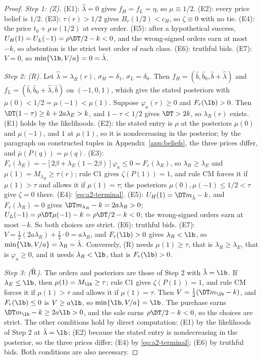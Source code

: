 \begin{proof}
\emph{Step 1: (Z).} (E1): \(\hat\lambda=0\) gives \(f_H=f_L=\eta\), so \(\mu\equiv1/2\). (E2): every price belief is
\(1/2\). (E3): \(\tau(r)>1/2\) gives \(B_r(1/2)<c_H\), so \(\zeta\equiv0\) with no tie. (E4): the price
\(t_0+\rho\,w(1/2)\) at every order. (E5): after a hypothetical success, \(U_H(1)=U_L(-1)=\rho\DT/2-k<0\), and the
wrong-signed orders earn at most \(-k\), so abstention is the strict best order of each class. (E6): truthful bids.
(E7): \(V=0\), so \(\min\{\lb,V/a\}=0=\hat\lambda\).

\emph{Step 2: (R).} Let \(\hat\lambda=\lambda_R(r)\), \(\sigma_H=\delta_1\), \(\sigma_L=\delta_0\). Then
\(f_H=(\hat b,\hat b_0,\hat b+\hat\lambda)\) and \(f_L=(\hat b,\hat b_0+\hat\lambda,\hat b)\) on \((-1,0,1)\), which give
the stated posteriors with \(\mu(0)<1/2=\mu(-1)<\mu(1)\). Suppose \(\varphi_a(r)\ge0\) and \(F_r(\lb)>0\). Then
\(\DT(1-\tau)\ge k+2a\lambda_E>k\), and \(1-\tau<1/2\) gives \(\DT>2k\), so \(\lambda_R(r)\) exists. (E1) holds by the
likelihoods. (E2): the stated entry is \(\rho\) at the posteriors \(\mu(0)\) and \(\mu(-1)\), and \(1\) at \(\mu(1)\),
so it is nondecreasing in the posterior; by the paragraph on constructed tuples in Appendix~\ref{app:beliefs}, the
three prices differ, and \(\bar\mu(P(q))=\mu(q)\). (E3): \(F_r(\lambda_E)=-[2\beta+\lambda_E(1-2\beta)]\varphi_a\le0
=F_r(\lambda_R)\), so \(\lambda_R\ge\lambda_E\) and \(\mu(1)=M_{\lambda_R}\ge\tau(r)\); rule C1 gives
\(\zeta(P(1))=1\), and rule CM forces it if \(\mu(1)>\tau\) and allows it if \(\mu(1)=\tau\); the posteriors
\(\mu(0),\mu(-1)\le1/2<\tau\) give \(\zeta=0\) there. (E4): \eqref{eq:a2-terminal}. (E5): \(U_H(1)=\DT m_{\hat\lambda}-k\),
and \(F_r(\lambda_R)=0\) gives \(\DT m_{\lambda_R}-k=2a\lambda_R>0\); \(U_L(-1)=\rho\DT\mu(-1)-k=\rho\DT/2-k<0\); the
wrong-signed orders earn at most \(-k\). So both choices are strict. (E6): truthful bids. (E7):
\(V=\tfrac12(2a\lambda_R)+\tfrac12\cdot0=a\lambda_R\), and \(F_r(\lb)>0\) gives \(\lambda_R<\lb\), so
\(\min\{\lb,V/a\}=\lambda_R=\hat\lambda\). Conversely, (R) needs \(\mu(1)\ge\tau\), that is \(\lambda_R\ge\lambda_E\),
that is \(\varphi_a\ge0\), and it needs \(\lambda_R<\lb\), that is \(F_r(\lb)>0\).

\emph{Step 3: (\(\bar{\rm R}\)).} The orders and posteriors are those of Step 2 with \(\hat\lambda=\lb\). If
\(\lambda_E\le\lb\), then \(\mu(1)=M_{\lb}\ge\tau\); rule C1 gives \(\zeta(P(1))=1\), and rule CM forces it if
\(\mu(1)>\tau\) and allows it if \(\mu(1)=\tau\). Then
\(V=\tfrac12(\DT m_{\lb}-k)\), and \(F_r(\lb)\le0\) is \(V\ge a\lb\), so \(\min\{\lb,V/a\}=\lb\). The purchase earns
\(\DT m_{\lb}-k\ge2a\lb>0\), and the sale earns \(\rho\DT/2-k<0\), so the choices are strict. The other conditions
hold by direct computation: (E1) by the likelihoods of Step 2 at \(\hat\lambda=\lb\); (E2) because the stated entry is
nondecreasing in the posterior, so the three prices differ; (E4) by \eqref{eq:a2-terminal}; (E6) by truthful bids.
Both conditions are also necessary.


\end{proof}

